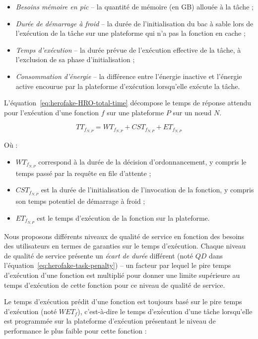 \begin{itemize}
    \item \textit{Besoins mémoire en pic} -- la quantité de mémoire (en GB) allouée à la tâche ;
    \item \textit{Durée de démarrage à froid} -- la durée de l'initialisation du bac à sable lors de l'exécution de la tâche sur une plateforme qui n'a pas la fonction en cache ;
    \item \textit{Temps d'exécution} -- la durée prévue de l'exécution effective de la tâche, à l'exclusion de sa phase d'initialisation ;
    \item \textit{Consommation d'énergie} -- la différence entre l'énergie inactive et l'énergie active encourue par la plateforme d'exécution lorsqu'elle exécute la tâche.
\end{itemize}

L'équation~\ref{eq:herofake-HRO-total-time} décompose le temps de réponse attendu pour l'exécution d'une fonction $f$ sur une plateforme $P$ sur un nœud $N$.

\begin{equation}
    {TT}_{{f}_{N, P}} = {WT}_{{f}_{N, P}} + {CST}_{{f}_{N, P}} + {ET}_{{f}_{N, P}}
\label{eq:herofake-HRO-total-time}
\end{equation}

Où :

\begin{itemize}
    \item ${WT}_{{f}_{N, P}}$ correspond à la durée de la décision d'ordonnancement, y compris le temps passé par la requête en file d'attente ;
    \item ${CST}_{{f}_{N, P}}$ est la durée de l'initialisation de l'invocation de la fonction, y compris son temps potentiel de démarrage à froid ;
    \item ${ET}_{{f}_{N, P}}$ est le temps d'exécution de la fonction sur la plateforme.
\end{itemize}

Nous proposons différents niveaux de qualité de service en fonction des besoins des utilisateurs en termes de garanties sur le temps d'exécution. Chaque niveau de qualité de service présente un \textit{écart de durée} différent (noté $QD$ dans l'équation~\ref{eq:herofake-task-penalty}) -- un facteur par lequel le pire temps d'exécution d'une fonction est multiplié pour donner une limite supérieure au temps d'exécution de cette fonction pour ce niveau de qualité de service.

Le temps d'exécution prédit d'une fonction est toujours basé sur le pire temps d'exécution (noté $WET_{f}$), c'est-à-dire le temps d'exécution d'une tâche lorsqu'elle est programmée sur la plateforme d'exécution présentant le niveau de performance le plus faible pour cette fonction :


